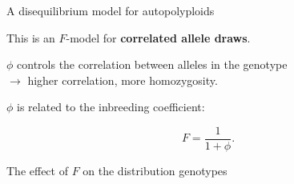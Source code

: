 \documentclass[presentation,sansserif,12pt]{beamer}
\begin{document}
  \begin{frame}[t]{A disequilibrium model for autopolyploids}
  
  This is an $F$-model for \textbf{correlated allele draws}.
  \vspace{0.3in}
  \pause
  
  $\phi$ controls the correlation between alleles in the genotype \pause \\[0.05in]\hspace{5pt}$\rightarrow$ higher correlation, more homozygosity.
  \vspace{0.3in}
  \pause
  

  \begin{tcolorbox}[colframe=itemcol, colback=white!40!black, coltext=white!95!black]
   $\phi$ is related to the inbreeding coefficient:
   
   \begin{equation*}
   	F = \frac{1}{1+\phi}.
  \end{equation*}
  
  \end{tcolorbox}

 
\end{frame}

{  
\begin{frame}[c,plain]{The effect of $F$ on the distribution genotypes}
\pause

  \begin{center}
  \end{center}
  
\end{frame}

}
\end{document}
